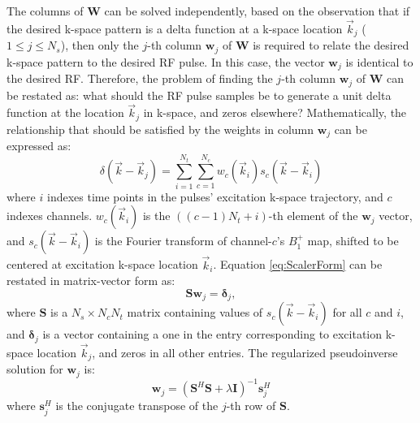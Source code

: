\par The columns of $\bm{W}$ can be solved independently, 
based on the observation that if the desired k-space pattern is a delta function at a k-space location 
$\vec{k}_j$ ($1\leq j \leq N_s$), 
then only the $j$-th column $\bm{w}_j$ of $\bm{W}$ is required to relate 
the desired k-space pattern to the desired RF pulse. 
In this case, the vector $\bm{w}_j$ is identical to the desired RF. 
Therefore, the problem of finding the $j$-th column $\bm{w}_j$ of $\bm{W}$ can be restated as: 
what should the RF pulse samples be to generate a unit delta function at the location $\vec{k}_j$ in k-space, 
and zeros elsewhere? 
Mathematically, the relationship that should be satisfied by the weights in column $\bm{w}_j$  can be expressed as:   
\begin{equation}\label{eq:ScalerForm}
\delta(\vec{k}-\vec{k}_j)=\sum_{i=1}^{N_t}\sum_{c=1}^{N_c} w_c(\vec{k}_i) s_c(\vec{k}-\vec{k}_i)
\end{equation}
where $i$ indexes time points in the pulses' excitation k-space trajectory, 
and $c$ indexes channels. 
$w_c(\vec{k}_i)$ is the $((c-1)N_t+i)$-th element of the $\bm{w}_j$ vector,
and $s_c(\vec{k}-\vec{k}_i)$ is the Fourier transform of channel-$c$'s $B_1^+$ map, 
shifted to be centered at excitation k-space location $\vec{k}_i$. 
Equation \ref{eq:ScalerForm} can be restated in matrix-vector form as:                                       
\begin{equation}\label{eq:MatrixForm}
\bm{Sw}_j=\bm{\delta}_j,
\end{equation}
where $\bm{S}$ is a $N_s \times N_c  N_t$ 
matrix containing values of $s_c(\vec{k}-\vec{k}_i)$ for all $c$ and $i$,
and $\bm{\delta}_j$ is a vector containing a one in the entry corresponding to excitation k-space location
$\vec{k}_j$, and zeros in all other entries. 
The regularized pseudoinverse solution for $\bm{w}_j$ is:                      
\begin{equation}\label{eq:Solution}
\bm{w}_j=\left( \bm{S}^{H} \bm{S} + \lambda \bm{I} \right) ^{-1} \bm{s}_j^{H}
\end{equation}
where $\bm{s}_j^{H}$ is the conjugate transpose of the $j$-th row of $\bm{S}$. 

